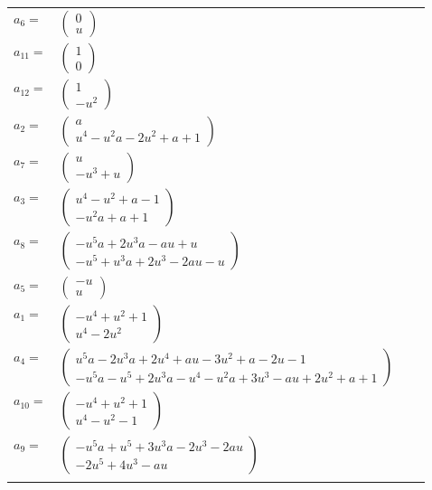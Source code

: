 \documentclass[1p]{elsarticle_modified}
\theoremstyle{definition}
\begin{document}
\begin{tabular}{m{7pt} m{180pt} m{7pt} m{180pt} }
\flushright $a_{6}=$&$\begin{pmatrix}0\\u\end{pmatrix}$ \\
\flushright $a_{11}=$&$\begin{pmatrix}1\\0\end{pmatrix}$ \\
\flushright $a_{12}=$&$\begin{pmatrix}1\\- u^2\end{pmatrix}$ \\
\flushright $a_{2}=$&$\begin{pmatrix}a\\u^4- u^2 a-2 u^2+a+1\end{pmatrix}$ \\
\flushright $a_{7}=$&$\begin{pmatrix}u\\- u^3+u\end{pmatrix}$ \\
\flushright $a_{3}=$&$\begin{pmatrix}u^4- u^2+a-1\\- u^2 a+a+1\end{pmatrix}$ \\
\flushright $a_{8}=$&$\begin{pmatrix}- u^5 a+2 u^3 a- a u+u\\- u^5+u^3 a+2 u^3-2 a u- u\end{pmatrix}$ \\
\flushright $a_{5}=$&$\begin{pmatrix}- u\\u\end{pmatrix}$ \\
\flushright $a_{1}=$&$\begin{pmatrix}- u^4+u^2+1\\u^4-2 u^2\end{pmatrix}$ \\
\flushright $a_{4}=$&$\begin{pmatrix}u^5 a-2 u^3 a+2 u^4+a u-3 u^2+a-2 u-1\\- u^5 a- u^5+2 u^3 a- u^4- u^2 a+3 u^3- a u+2 u^2+a+1\end{pmatrix}$ \\
\flushright $a_{10}=$&$\begin{pmatrix}- u^4+u^2+1\\u^4- u^2-1\end{pmatrix}$ \\
\flushright $a_{9}=$&$\begin{pmatrix}- u^5 a+u^5+3 u^3 a-2 u^3-2 a u\\-2 u^5+4 u^3- a u\end{pmatrix}$\\&\end{tabular}
\end{document}

